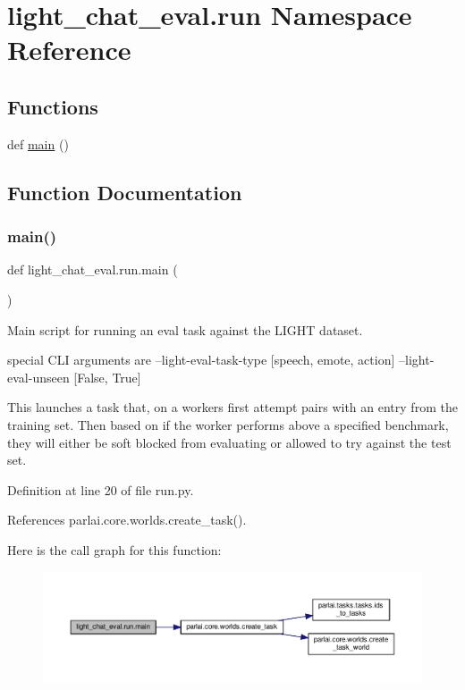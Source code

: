 \hypertarget{namespacelight__chat__eval_1_1run}{}\section{light\+\_\+chat\+\_\+eval.\+run Namespace Reference}
\label{namespacelight__chat__eval_1_1run}
\subsection*{Functions}
\begin{DoxyCompactItemize}
\item 
def \hyperlink{namespacelight__chat__eval_1_1run_a6f95134244efdc98f98e673ae68c8037}{main} ()
\end{DoxyCompactItemize}


\subsection{Function Documentation}
\mbox{\label{namespacelight__chat__eval_1_1run_a6f95134244efdc98f98e673ae68c8037}} 
\subsubsection{\texorpdfstring{main()}{main()}}
{\footnotesize\ttfamily def light\+\_\+chat\+\_\+eval.\+run.\+main (\begin{DoxyParamCaption}{ }\end{DoxyParamCaption})}

\begin{DoxyVerb}Main script for running an eval task against the LIGHT dataset.

special CLI arguments are
  --light-eval-task-type [speech, emote, action]
  --light-eval-unseen [False, True]

This launches a task that, on a workers first attempt pairs with an entry
from the training set. Then based on if the worker performs above a
specified benchmark, they will either be soft blocked from evaluating or
allowed to try against the test set.
\end{DoxyVerb}
 

Definition at line 20 of file run.\+py.



References parlai.\+core.\+worlds.\+create\+\_\+task().

Here is the call graph for this function\+:
\nopagebreak
\begin{figure}[H]
\begin{center}
\leavevmode
\includegraphics[width=350pt]{namespacelight__chat__eval_1_1run_a6f95134244efdc98f98e673ae68c8037_cgraph}
\end{center}
\end{figure}
